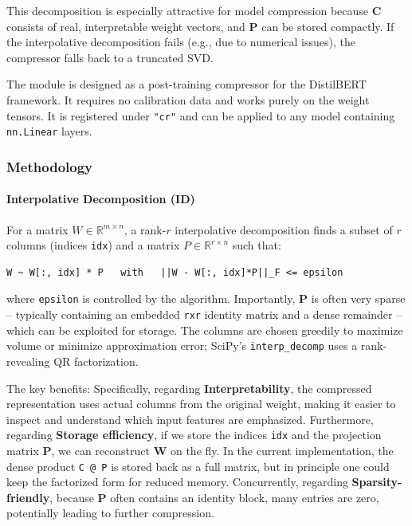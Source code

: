 This decomposition is especially attractive for model compression because \textbf{C} consists of real, interpretable weight vectors, and \textbf{P} can be stored compactly. If the interpolative decomposition fails (e.g., due to numerical issues), the compressor falls back to a truncated SVD.

The module is designed as a post-training compressor for the DistilBERT framework. It requires no calibration data and works purely on the weight tensors. It is registered under \texttt{"cr"} and can be applied to any model containing \texttt{nn.Linear} layers.


\subsubsection*{Methodology}

\paragraph{Interpolative Decomposition (ID)}

For a matrix $W \in \mathbb{R}^{m \times n}$, a rank-$r$ interpolative decomposition finds a subset of $r$ columns (indices \texttt{idx}) and a matrix $P \in \mathbb{R}^{r \times n}$ such that:

\vspace{0.5em}
\begin{mdframed}[backgroundcolor=codebg, linecolor=codeframe, linewidth=1pt, roundcorner=4pt, innerleftmargin=2pt, innerrightmargin=5pt, innertopmargin=5pt, innerbottommargin=5pt]
\begin{lstlisting}
W ~ W[:, idx] * P   with   ||W - W[:, idx]*P||_F <= epsilon
\end{lstlisting}
\end{mdframed}
\vspace{0.5em}

where \texttt{epsilon} is controlled by the algorithm. Importantly, \textbf{P} is often very sparse -- typically containing an embedded \texttt{rxr} identity matrix and a dense remainder -- which can be exploited for storage. The columns are chosen greedily to maximize volume or minimize approximation error; SciPy's \texttt{interp\_decomp} uses a rank-revealing QR factorization.

The key benefits:
Specifically, regarding \textbf{Interpretability}, the compressed representation uses actual columns from the original weight, making it easier to inspect and understand which input features are emphasized. Furthermore, regarding \textbf{Storage efficiency}, if we store the indices \texttt{idx} and the projection matrix \textbf{P}, we can reconstruct \textbf{W} on the fly. In the current implementation, the dense product \texttt{C @ P} is stored back as a full matrix, but in principle one could keep the factorized form for reduced memory. Concurrently, regarding \textbf{Sparsity-friendly}, because \textbf{P} often contains an identity block, many entries are zero, potentially leading to further compression.


